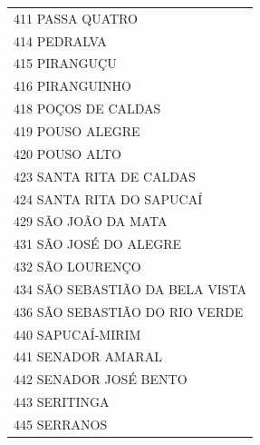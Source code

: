 \documentclass{article}
\begin{document}
\begin{longtable}[c]{m{18cm}}
\multicolumn{1}{l}{ \hspace{2em} 411 PASSA QUATRO } \\
\multicolumn{1}{l}{ \hspace{2em} 414 PEDRALVA } \\
\multicolumn{1}{l}{ \hspace{2em} 415 PIRANGUÇU } \\
\multicolumn{1}{l}{ \hspace{2em} 416 PIRANGUINHO } \\
\multicolumn{1}{l}{ \hspace{2em} 418 POÇOS DE CALDAS } \\
\multicolumn{1}{l}{ \hspace{2em} 419 POUSO ALEGRE } \\
\multicolumn{1}{l}{ \hspace{2em} 420 POUSO ALTO } \\
\multicolumn{1}{l}{ \hspace{2em} 423 SANTA RITA DE CALDAS } \\
\multicolumn{1}{l}{ \hspace{2em} 424 SANTA RITA DO SAPUCAÍ } \\
\multicolumn{1}{l}{ \hspace{2em} 429 SÃO JOÃO DA MATA } \\
\multicolumn{1}{l}{ \hspace{2em} 431 SÃO JOSÉ DO ALEGRE } \\
\multicolumn{1}{l}{ \hspace{2em} 432 SÃO LOURENÇO } \\
\multicolumn{1}{l}{ \hspace{2em} 434 SÃO SEBASTIÃO DA BELA VISTA } \\
\multicolumn{1}{l}{ \hspace{2em} 436 SÃO SEBASTIÃO DO RIO VERDE } \\
\multicolumn{1}{l}{ \hspace{2em} 440 SAPUCAÍ-MIRIM } \\
\multicolumn{1}{l}{ \hspace{2em} 441 SENADOR AMARAL } \\
\multicolumn{1}{l}{ \hspace{2em} 442 SENADOR JOSÉ BENTO } \\
\multicolumn{1}{l}{ \hspace{2em} 443 SERITINGA } \\
\multicolumn{1}{l}{ \hspace{2em} 445 SERRANOS } \\

\end{longtable}
\end{document}
